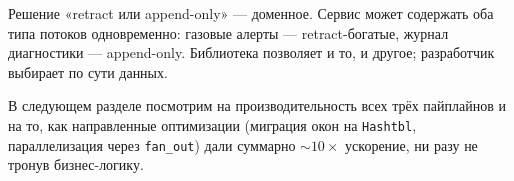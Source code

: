 Решение «retract или append-only» --- доменное. Сервис может
содержать оба типа потоков одновременно: газовые алерты ---
retract-богатые, журнал диагностики --- append-only. Библиотека
позволяет и то, и другое; разработчик выбирает по сути данных.

\medskip

В следующем разделе посмотрим на производительность всех трёх
пайплайнов и на то, как направленные оптимизации (миграция окон на
\texttt{Hashtbl}, параллелизация через \texttt{fan\_out}) дали
суммарно $\sim 10\times$ ускорение, ни разу не тронув бизнес-логику.

